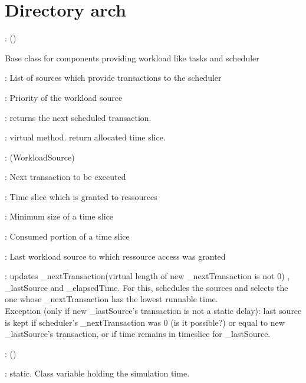 \documentclass[a4paper,11pt]{article}
\newcommand{\bfont}{\fontseries{b}\selectfont}
\newcommand{\cod}[1]{{\ttfamily #1}}
\newcommand{\class}[2]{\par\vspace{1mm}\hspace{-5mm}\large\colorbox{file}{\textbullet\bfont\cod{#1}:} (\cod{#2})\par}
\newcommand{\method}[1]{\par\vspace{1mm}\hspace{-2mm}\colorbox{method}{\textopenbullet\bfont\cod{#1}:}}
\newcommand{\variable}[1]{\par\vspace{1mm}\hspace{-2mm}\colorbox{variable}{\textopenbullet\bfont\cod{#1}:}}
\begin{document}
\section*{Directory \cod{arch}}
	
\class{WorkloadSource}{}
Base class for components providing workload like tasks and scheduler
\variable{workloadList} List of sources which provide transactions to the scheduler

\variable{\_priority} Priority of the workload source

\method{getNextTransaction} returns the next scheduled transaction.

\method{schedule(iEndSchedule)} virtual method. return allocated time slice.

\class{RRScheduler}{WorkloadSource}

\variable{\_nextTransaction} Next transaction to be executed

\variable{\_timeSlice} Time slice which is granted to ressources

\variable{\_minSliceSize} Minimum size of a time slice

\variable{\_elapsedTime} Consumed portion of a time slice

\variable{\_lastSource} Last workload source to which ressource access was granted

\method{schedule(iEndSchedule)} updates \cod{\_nextTransaction}(virtual length of new \cod{\_next\-Transaction} is not 0) , \cod{\_lastSource} and \cod{\_elapsedTime}.
For this, schedules the sources and selects the one whose \cod{\_nextTransaction} has the lowest runnable time.\\ Exception (only if new  \cod{\_lastSource}'s transaction is not a static delay): last source is kept if scheduler's \cod{\_nextTransaction} was 0 (is it possible?) or equal to  new  \cod{\_lastSource}'s transaction, or if time remains in timeslice for \cod{\_lastSource}.

\class{ScedulableDevice}{}

\variable{\_simulatedTime} static. Class variable holding the simulation time.
\end{document}
